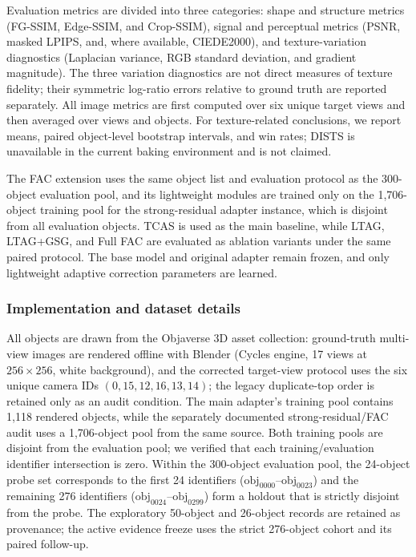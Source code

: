 \documentclass[times,twocolumn,final]{elsarticle}
\begin{document}
Evaluation metrics are divided into three categories: shape and structure metrics (FG-SSIM, Edge-SSIM, and Crop-SSIM), signal and perceptual metrics (PSNR, masked LPIPS, and, where available, CIEDE2000), and texture-variation diagnostics (Laplacian variance, RGB standard deviation, and gradient magnitude). The three variation diagnostics are not direct measures of texture fidelity; their symmetric log-ratio errors relative to ground truth are reported separately. All image metrics are first computed over six unique target views and then averaged over views and objects. For texture-related conclusions, we report means, paired object-level bootstrap intervals, and win rates; DISTS is unavailable in the current baking environment and is not claimed.

The FAC extension uses the same object list and evaluation protocol as the 300-object evaluation pool, and its lightweight modules are trained only on the 1,706-object training pool for the strong-residual adapter instance, which is disjoint from all evaluation objects. TCAS is used as the main baseline, while LTAG, LTAG+GSG, and Full FAC are evaluated as ablation variants under the same paired protocol. The base model and original adapter remain frozen, and only lightweight adaptive correction parameters are learned.

\subsubsection{Implementation and dataset details}

All objects are drawn from the Objaverse 3D asset collection: ground-truth multi-view images are rendered offline with Blender (Cycles engine, 17 views at $256\times256$, white background), and the corrected target-view protocol uses the six unique camera IDs $(0,15,12,16,13,14)$; the legacy duplicate-top order is retained only as an audit condition. The main adapter's training pool contains 1{,}118 rendered objects, while the separately documented strong-residual/FAC audit uses a 1{,}706-object pool from the same source. Both training pools are disjoint from the evaluation pool; we verified that each training/evaluation identifier intersection is zero. Within the 300-object evaluation pool, the 24-object probe set corresponds to the first 24 identifiers ($\mathrm{obj}_{0000}$--$\mathrm{obj}_{0023}$) and the remaining 276 identifiers ($\mathrm{obj}_{0024}$--$\mathrm{obj}_{0299}$) form a holdout that is strictly disjoint from the probe. The exploratory 50-object and 26-object records are retained as provenance; the active evidence freeze uses the strict 276-object cohort and its paired follow-up.
\end{document}
